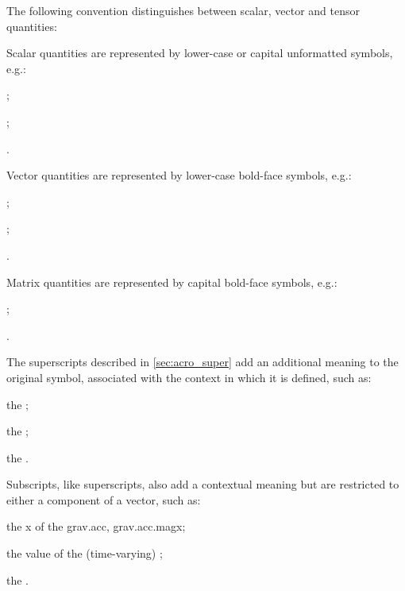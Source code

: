 

\ifdefined\IncludeSymbolsText
The following convention distinguishes between scalar, vector and tensor quantities:
\begin{itemize*}
\item Scalar quantities are represented by lower-case or capital unformatted symbols, e.g.:
  \begin{itemize*}
  \item {};
  \item {};
  \item {}.
\end{itemize*}
\item Vector quantities are represented by lower-case bold-face symbols, e.g.:
  \begin{itemize*}
  \item {};
  \item {};
  \item {}.
  \end{itemize*}
\item Matrix quantities are represented by capital bold-face symbols, e.g.:
  \begin{itemize*}
  \item {};
  \item {}.
  \end{itemize*}
\end{itemize*}

The superscripts described in \ref{sec:acro_super} add an additional meaning to the original symbol, associated with the context in which it is defined, such as:
\begin{itemize*}
\item the ;
\item the ;
\item the .
\end{itemize*}

Subscripts, like superscripts, also add a contextual meaning but are restricted to either a component of a vector, such as:
\begin{itemize*}
\item the \acl{x} of the \acl{grav.acc}, \acs{grav.acc.mag}\acs{x};
\item the value of the (time-varying) ;
\item the .
\end{itemize*}

